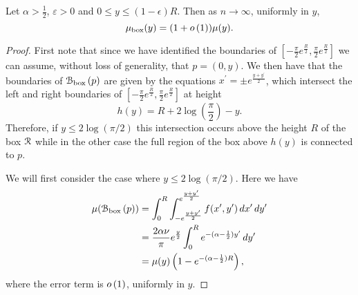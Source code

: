 \begin{lemma}\label{lem:average_degree_G_box}
Let $\alpha > \frac{1}{2}$, $\varepsilon >0$ and $0 \leq y \leq (1-\epsilon)R$. Then as $n \to \infty$, uniformly in $y$,
\[
	\mu_{\mathrm{box}}(y) = (1+o\left(1\right)) \mu(y).
\]
\end{lemma}

\begin{proof}
First note that since we have identified the boundaries of $[-\frac{\pi}{2}e^{\frac{R}{2}}, \frac{\pi}{2}e^{\frac{R}{2}}]$ we can assume, without loss of generality, that $p = (0,y)$. We then have that the boundaries of ${\mathcal B}_{\text{box}}\left(p\right)$ are given by the equations $x^\prime = \pm e^{\frac{y+y^\prime}{2}}$, which intersect the left and right boundaries of $[-\frac{\pi}{2}e^{\frac{R}{2}}, \frac{\pi}{2}e^{\frac{R}{2}}]$ at height
\[
	h(y) = R + 2 \log\left(\frac{\pi}{2}\right) - y.
\]
Therefore, if $y \le 2 \log(\pi/2)$ this intersection occurs above the height $R$ of the box ${\mathcal R}$ while in the other case the full region of the box above $h(y)$ is connected to $p$. 

We will first consider the case where $y \le 2 \log(\pi/2)$. Here we have
\begin{align*}
	\mu({\mathcal B}_{\text{box}}\left(p\right))
	&= \int_0^{R} \int_{-e^{\frac{y+y^\prime}{2}}}^{e^{\frac{y+y^\prime}{2}}} 
		f(x^\prime,y^\prime) \, dx^\prime \, dy^\prime\\
	&= \frac{2 \alpha \nu}{\pi} e^{\frac{y}{2}} \int_0^{R} e^{-(\alpha - \frac{1}{2})y^\prime} \, dy^\prime\\
	&= \mu(y)\left(1 - e^{-(\alpha - \frac{1}{2})R}\right),
\end{align*}
where the error term is $o\left(1\right)$, uniformly in $y$.


\end{proof}
